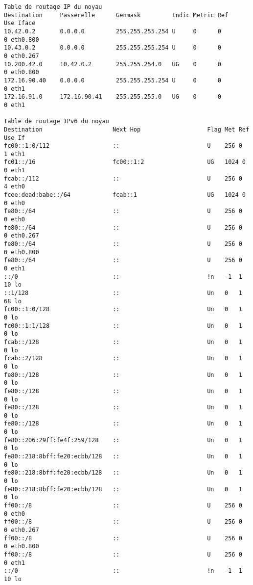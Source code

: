 \begin{verbatim}
Table de routage IP du noyau
Destination     Passerelle      Genmask         Indic Metric Ref    Use Iface
10.42.0.2       0.0.0.0         255.255.255.254 U     0      0        0 eth0.800
10.43.0.2       0.0.0.0         255.255.255.254 U     0      0        0 eth0.267
10.200.42.0     10.42.0.2       255.255.254.0   UG    0      0        0 eth0.800
172.16.90.40    0.0.0.0         255.255.255.254 U     0      0        0 eth1
172.16.91.0     172.16.90.41    255.255.255.0   UG    0      0        0 eth1

Table de routage IPv6 du noyau
Destination                    Next Hop                   Flag Met Ref Use If
fc00::1:0/112                  ::                         U    256 0     1 eth1
fc01::/16                      fc00::1:2                  UG   1024 0     0 eth1
fcab::/112                     ::                         U    256 0     4 eth0
fcee:dead:babe::/64            fcab::1                    UG   1024 0     0 eth0
fe80::/64                      ::                         U    256 0     0 eth0
fe80::/64                      ::                         U    256 0     0 eth0.267
fe80::/64                      ::                         U    256 0     0 eth0.800
fe80::/64                      ::                         U    256 0     0 eth1
::/0                           ::                         !n   -1  1    10 lo
::1/128                        ::                         Un   0   1    68 lo
fc00::1:0/128                  ::                         Un   0   1     0 lo
fc00::1:1/128                  ::                         Un   0   1     0 lo
fcab::/128                     ::                         Un   0   1     0 lo
fcab::2/128                    ::                         Un   0   1     0 lo
fe80::/128                     ::                         Un   0   1     0 lo
fe80::/128                     ::                         Un   0   1     0 lo
fe80::/128                     ::                         Un   0   1     0 lo
fe80::/128                     ::                         Un   0   1     0 lo
fe80::206:29ff:fe4f:259/128    ::                         Un   0   1     0 lo
fe80::218:8bff:fe20:ecbb/128   ::                         Un   0   1     0 lo
fe80::218:8bff:fe20:ecbb/128   ::                         Un   0   1     0 lo
fe80::218:8bff:fe20:ecbb/128   ::                         Un   0   1     0 lo
ff00::/8                       ::                         U    256 0     0 eth0
ff00::/8                       ::                         U    256 0     0 eth0.267
ff00::/8                       ::                         U    256 0     0 eth0.800
ff00::/8                       ::                         U    256 0     0 eth1
::/0                           ::                         !n   -1  1    10 lo
\end{verbatim}

